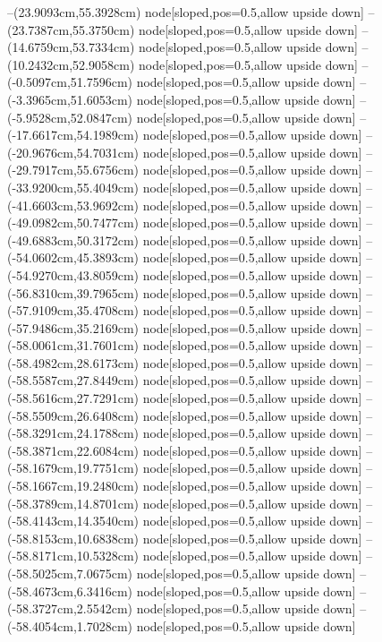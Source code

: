 --(23.9093cm,55.3928cm) node[sloped,pos=0.5,allow upside down]{\ArrowIn}
--(23.7387cm,55.3750cm) node[sloped,pos=0.5,allow upside down]{\arrowIn}
--(14.6759cm,53.7334cm) node[sloped,pos=0.5,allow upside down]{\ArrowIn}
--(10.2432cm,52.9058cm) node[sloped,pos=0.5,allow upside down]{\ArrowIn}
--(-0.5097cm,51.7596cm) node[sloped,pos=0.5,allow upside down]{\ArrowIn}
--(-3.3965cm,51.6053cm) node[sloped,pos=0.5,allow upside down]{\ArrowIn}
--(-5.9528cm,52.0847cm) node[sloped,pos=0.5,allow upside down]{\ArrowIn}
--(-17.6617cm,54.1989cm) node[sloped,pos=0.5,allow upside down]{\ArrowIn}
--(-20.9676cm,54.7031cm) node[sloped,pos=0.5,allow upside down]{\ArrowIn}
--(-29.7917cm,55.6756cm) node[sloped,pos=0.5,allow upside down]{\ArrowIn}
--(-33.9200cm,55.4049cm) node[sloped,pos=0.5,allow upside down]{\ArrowIn}
--(-41.6603cm,53.9692cm) node[sloped,pos=0.5,allow upside down]{\ArrowIn}
--(-49.0982cm,50.7477cm) node[sloped,pos=0.5,allow upside down]{\ArrowIn}
--(-49.6883cm,50.3172cm) node[sloped,pos=0.5,allow upside down]{\arrowIn}
--(-54.0602cm,45.3893cm) node[sloped,pos=0.5,allow upside down]{\ArrowIn}
--(-54.9270cm,43.8059cm) node[sloped,pos=0.5,allow upside down]{\ArrowIn}
--(-56.8310cm,39.7965cm) node[sloped,pos=0.5,allow upside down]{\ArrowIn}
--(-57.9109cm,35.4708cm) node[sloped,pos=0.5,allow upside down]{\ArrowIn}
--(-57.9486cm,35.2169cm) node[sloped,pos=0.5,allow upside down]{\arrowIn}
--(-58.0061cm,31.7601cm) node[sloped,pos=0.5,allow upside down]{\ArrowIn}
--(-58.4982cm,28.6173cm) node[sloped,pos=0.5,allow upside down]{\ArrowIn}
--(-58.5587cm,27.8449cm) node[sloped,pos=0.5,allow upside down]{\arrowIn}
--(-58.5616cm,27.7291cm) node[sloped,pos=0.5,allow upside down]{\arrowIn}
--(-58.5509cm,26.6408cm) node[sloped,pos=0.5,allow upside down]{\ArrowIn}
--(-58.3291cm,24.1788cm) node[sloped,pos=0.5,allow upside down]{\ArrowIn}
--(-58.3871cm,22.6084cm) node[sloped,pos=0.5,allow upside down]{\ArrowIn}
--(-58.1679cm,19.7751cm) node[sloped,pos=0.5,allow upside down]{\ArrowIn}
--(-58.1667cm,19.2480cm) node[sloped,pos=0.5,allow upside down]{\arrowIn}
--(-58.3789cm,14.8701cm) node[sloped,pos=0.5,allow upside down]{\ArrowIn}
--(-58.4143cm,14.3540cm) node[sloped,pos=0.5,allow upside down]{\arrowIn}
--(-58.8153cm,10.6838cm) node[sloped,pos=0.5,allow upside down]{\ArrowIn}
--(-58.8171cm,10.5328cm) node[sloped,pos=0.5,allow upside down]{\arrowIn}
--(-58.5025cm,7.0675cm) node[sloped,pos=0.5,allow upside down]{\ArrowIn}
--(-58.4673cm,6.3416cm) node[sloped,pos=0.5,allow upside down]{\arrowIn}
--(-58.3727cm,2.5542cm) node[sloped,pos=0.5,allow upside down]{\ArrowIn}
--(-58.4054cm,1.7028cm) node[sloped,pos=0.5,allow upside down]{\arrowIn}
